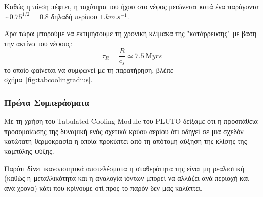 	Καθώς η πίεση πέφτει, η ταχύτητα του ήχου στο νέφος μειώνεται κατά ένα παράγοντα $\sim 0.75^{1/2}=0.8$ δηλαδή περίπου $1\si{.km.s^{-1}}$.
	
%	
	Άρα τώρα μπορούμε να εκτιμήσουμε τη χρονική κλίμακα της "κατάρρευσης" με βάση την ακτίνα του νέφους:
	\begin{equation}
	\tau_R=\frac{R}{c_s} \simeq \SI{7.5}{\mega yrs}
	\end{equation}
	το οποίο φαίνεται να συμφωνεί με τη παρατήρηση, βλέπε σχήμα~\ref{fig:tabcoolingradius}.
	
	\subsubsection{Πρώτα Συμπεράσματα}
	Με τη χρήση του Tabulated Cooling Module του PLUTO δείξαμε ότι η προσπάθεια προσομοίωσης της δυναμική ενός σχετικά κρύου αερίου ότι οδηγεί σε μια σχεδόν κατώτατη θερμοκρασία η οποία προκύπτει από τη απότομη αύξηση της κλίσης της καμπύλης ψύξης.
	
	Παρότι δίνει ικανοποιητικά αποτελέσματα η σταθερότητα της είναι μη ρεαλιστική (καθώς η μεταλλικότητα και η αναλογία ιόντων μπορεί να αλλάζει ανά περιοχή και ανά χρονο) κάτι που κρίνουμε οτί προς το παρόν δεν μας καλύπτει.
	
%	
%	
%	
%	
